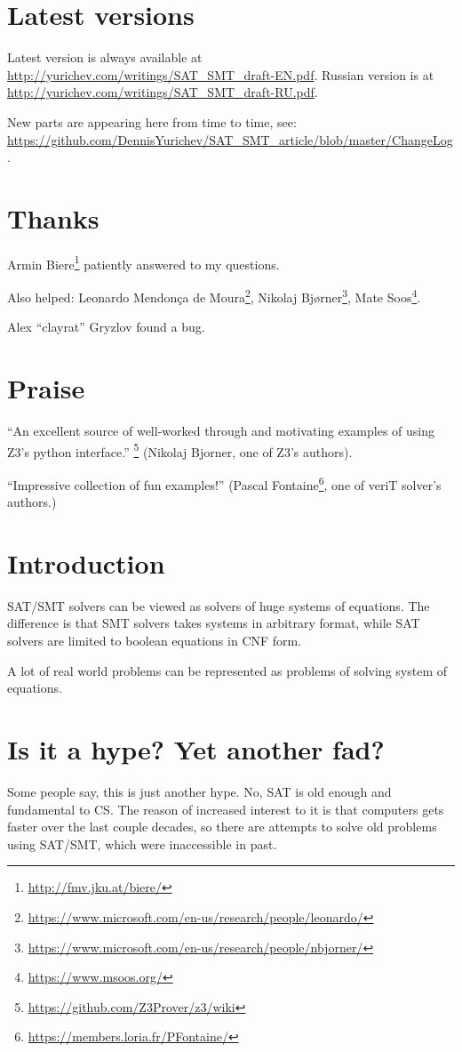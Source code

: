 \section{Latest versions}

Latest version is always available at \url{http://yurichev.com/writings/SAT_SMT_draft-EN.pdf}.
Russian version is at \url{http://yurichev.com/writings/SAT_SMT_draft-RU.pdf}.

New parts are appearing here from time to time, see: \url{https://github.com/DennisYurichev/SAT_SMT_article/blob/master/ChangeLog}.

\section{Thanks}

Armin Biere\footnote{\url{http://fmv.jku.at/biere/}} patiently answered to my questions.

Also helped: Leonardo Mendonça de Moura\footnote{\url{https://www.microsoft.com/en-us/research/people/leonardo/}},
Nikolaj Bjørner\footnote{\url{https://www.microsoft.com/en-us/research/people/nbjorner/}},
Mate Soos\footnote{\url{https://www.msoos.org/}}.

Alex ``clayrat'' Gryzlov found a bug.

\section{Praise}

``An excellent source of well-worked through and motivating examples of using Z3's python interface.''
\footnote{\url{https://github.com/Z3Prover/z3/wiki}}
(Nikolaj Bjorner, one of Z3's authors).

``Impressive collection of fun examples!''
(Pascal Fontaine\footnote{\url{https://members.loria.fr/PFontaine/}}, one of veriT solver's authors.)

\section{Introduction}

\ac{SAT}/\ac{SMT} solvers can be viewed as solvers of huge systems of equations.
The difference is that \ac{SMT} solvers takes systems in arbitrary format,
while \ac{SAT} solvers are limited to boolean equations in \ac{CNF} form.

A lot of real world problems can be represented as problems of solving system of equations.

\section{Is it a hype? Yet another fad?}

Some people say, this is just another hype.
No, \ac{SAT} is old enough and fundamental to \ac{CS}.
The reason of increased interest to it is that computers gets faster over the last couple decades,
so there are attempts to solve old problems using \ac{SAT}/\ac{SMT}, which were inaccessible in past.

